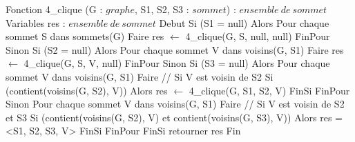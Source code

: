 \begin{algorithm}[caption={4-clique}] \label{alg:4clique}
    Fonction 4_clique (G : $graphe$, S1, S2, S3 : $sommet$) : $ensemble\ de\ sommet$
    Variables
        res : $ensemble\ de\ sommet$
    Debut
        Si (S1 = null) Alors
            Pour chaque sommet S dans sommets(G) Faire
                res $\gets$ 4_clique(G, S, null, null)
            FinPour
        Sinon Si (S2 = null) Alors
            Pour chaque sommet V dans voisins(G, S1) Faire
                res $\gets$ 4_clique(G, S, V, null)
            FinPour
        Sinon Si (S3 = null) Alors
            Pour chaque sommet V dans voisins(G, S1) Faire
                // Si V est voisin de S2
                Si (contient(voisins(G, S2), V)) Alors
                    res $\gets$ 4_clique(G, S1, S2, V)
                FinSi
            FinPour
        Sinon
            Pour chaque sommet V dans voisins(G, S1) Faire
                // Si V est voisin de S2 et S3
                Si (contient(voisins(G, S2), V) et contient(voisins(G, S3), V)) Alors
                    res = <S1, S2, S3, V>
                FinSi
            FinPour
        FinSi
        retourner res
    Fin
\end{algorithm}